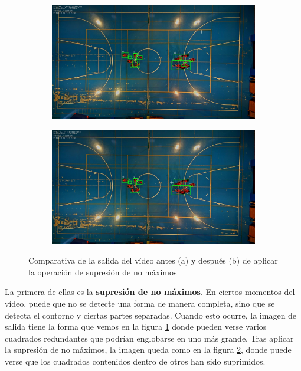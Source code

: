 \begin{figure}
\begin{subfigure}{.5\textwidth}
  \centering
  \includegraphics[width=.9\linewidth]{images/nonms}
  \caption { }
  \label{fig:nms1a}
\end{subfigure}%
\begin{subfigure}{.5\textwidth}
  \centering
  \includegraphics[width=.9\linewidth]{images/nms}
  \caption { }
  \label{fig:nms1b}
\end{subfigure}
\caption{Comparativa de la salida del vídeo antes (a) y después (b) de aplicar la operación de supresión de no máximos }
\label{fig:nms}
\end{figure}

La primera de ellas es la \textbf{supresión de no máximos}. En ciertos momentos del vídeo, puede que no se detecte una forma de manera completa, sino que se detecta el contorno y ciertas partes separadas. Cuando esto ocurre, la imagen de salida tiene la forma que vemos en la figura \ref{fig:nms1a} donde pueden verse varios cuadrados redundantes que podrían englobarse en uno más grande. Tras aplicar la supresión de no máximos, la imagen queda como en la figura \ref{fig:nms1b}, donde puede verse que los cuadrados contenidos dentro de otros han sido suprimidos.

